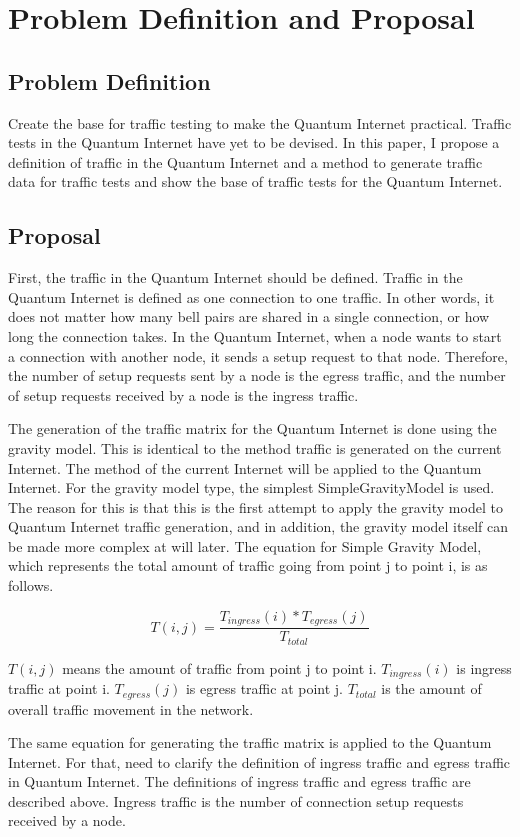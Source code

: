 \chapter{Problem Definition and Proposal}
\label{problem_definition_and_proposal}

\section{Problem Definition}
Create the base for traffic testing to make the Quantum Internet practical. 
Traffic tests in the Quantum Internet have yet to be devised. 
In this paper, I propose a definition of traffic in the Quantum Internet and a method to generate traffic data for traffic tests and show the base of traffic tests for the Quantum Internet.

\section{Proposal}
First, the traffic in the Quantum Internet should be defined. 
Traffic in the Quantum Internet is defined as one connection to one traffic. 
In other words, it does not matter how many bell pairs are shared in a single connection, or how long the connection takes.
In the Quantum Internet, when a node wants to start a connection with another node, it sends a setup request to that node.
Therefore, the number of setup requests sent by a node is the egress traffic, and the number of setup requests received by a node is the ingress traffic.

The generation of the traffic matrix for the Quantum Internet is done using the gravity model. 
This is identical to the method traffic is generated on the current Internet. 
The method of the current Internet will be applied to the Quantum Internet.
For the gravity model type, the simplest SimpleGravityModel is used.
The reason for this is that this is the first attempt to apply the gravity model to Quantum Internet traffic generation, and in addition, the gravity model itself can be made more complex at will later.
The equation for Simple Gravity Model\cite{zhang2003fast}\cite{trafficmatrix_presentation}, which represents the total amount of traffic going from point j to point i, is as follows.
\begin{screen}
    \begin{dfn}
        \begin{equation}
            T(i,j) = \frac{T_{ingress}(i)*T_{egress}(j)}{T_{total}}
        \end{equation}
    \end{dfn}
    $T(i,j)$ means the amount of traffic from point j to point i. 
    $T_{ingress}(i)$ is ingress traffic at point i.
    $T_{egress}(j)$ is egress traffic at point j.
    $T_{total}$ is the amount of overall traffic movement in the network.
\end{screen}
The same equation for generating the traffic matrix is applied to the Quantum Internet. 
For that, need to clarify the definition of ingress traffic and egress traffic in Quantum Internet.
The definitions of ingress traffic and egress traffic are described above. 
Ingress traffic is the number of connection setup requests received by a node. 

